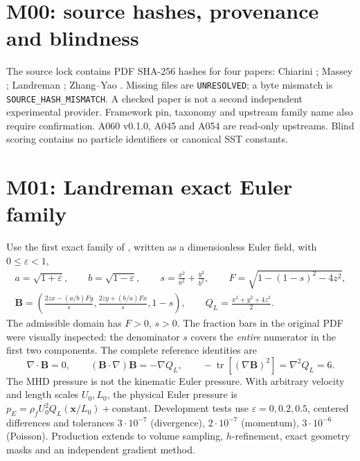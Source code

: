 \documentclass[10pt,a4paper]{article}
\newcommand{\code}[1]{\texttt{#1}}
\begin{document}
\section{M00: source hashes, provenance and blindness}
The source lock contains PDF SHA-256 hashes for four papers: Chiarini \cite{Chiarini2026}; Massey \cite{Massey2026}; Landreman \cite{Landreman2026}; Zhang--Yao \cite{ZhangYao2026}. Missing files are \code{UNRESOLVED}; a byte mismatch is \code{SOURCE\_HASH\_MISMATCH}. A checked paper is not a second independent experimental provider. Framework pin, taxonomy and upstream family name also require confirmation. A060 v0.1.0, A045 and A054 are read-only upstreams. Blind scoring contains no particle identifiers or canonical SST constants.

\section{M01: Landreman exact Euler family}
Use the first exact family of \cite{Landreman2026}, written as a dimensionless Euler field, with $0\leq\varepsilon<1$,
\begin{gather}
 a=\sqrt{1+\varepsilon},\qquad b=\sqrt{1-\varepsilon},\qquad
 s=\frac{x^2}{a^2}+\frac{y^2}{b^2},\qquad
 F=\sqrt{1-(1-s)^2-4z^2},\\
 \mathbf B=\left(\frac{2zx-(a/b)Fy}{s},\frac{2zy+(b/a)Fx}{s},1-s\right),\qquad
 Q_L=\frac{x^2+y^2+4z^2}{2}.
\end{gather}
The admissible domain has $F>0$, $s>0$. The fraction bars in the original PDF were visually inspected: the denominator $s$ covers the \emph{entire} numerator in the first two components. The complete reference identities are
\begin{equation}
 \nabla\cdot\mathbf B=0,\qquad (\mathbf B\cdot\nabla)\mathbf B=-\nabla Q_L,\qquad -\operatorname{tr}[(\nabla\mathbf B)^2]=\nabla^2Q_L=6.
\end{equation}
The MHD pressure is not the kinematic Euler pressure. With arbitrary velocity and length scales $U_0,L_0$, the physical Euler pressure is $p_E=\rho_{\!f}U_0^2Q_L(\mathbf x/L_0)+\mathrm{constant}$. Development tests use $\varepsilon=0,0.2,0.5$, centered differences and tolerances $3\cdot10^{-7}$ (divergence), $2\cdot10^{-7}$ (momentum), $3\cdot10^{-6}$ (Poisson). Production extends to volume sampling, $h$-refinement, exact geometry masks and an independent gradient method.
\end{document}
